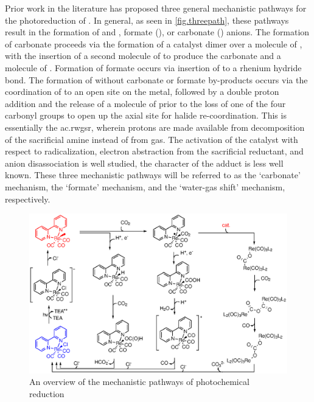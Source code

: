 Prior work in the literature has proposed three general mechanistic pathways for the photoreduction of . In general, as seen in \autoref{fig.threepath}, these pathways result in the formation of  and , formate (), or carbonate () anions. The formation of carbonate proceeds via the formation of a catalyst dimer over a molecule of , with the insertion of a second molecule of  to produce the carbonate and a molecule of . Formation of formate occurs via insertion of  to a rhenium hydride bond. The formation of  without carbonate or formate by-products occurs via the coordination of  to an open site on the metal, followed by a double proton addition and the release of a molecule of  prior to the loss of one of the four carbonyl groups to open up the axial site for halide re-coordination. This is essentially the \gls{ac.rwgsr}, wherein protons are made available from decomposition of the sacrificial amine instead of from  gas\autocite{kalyanasundaram1978}. The activation of the catalyst with respect to radicalization, electron abstraction from the sacrificial reductant, and anion disassociation is well studied, the character of the  adduct is less well known. These three mechanistic pathways will be referred to as the `carbonate' mechanism, the `formate' mechanism, and the `water-gas shift' mechanism, respectively.

\begin{figure}[!htb]
 \begin{center}
  \includegraphics[clip=true, width=\textwidth, keepaspectratio]{images/threepaths.eps}
 \end{center}
\caption[Overview of mechanistic pathways]{An overview of the mechanistic pathways of photochemical  reduction}
\label{fig.threepath}
\end{figure} 

